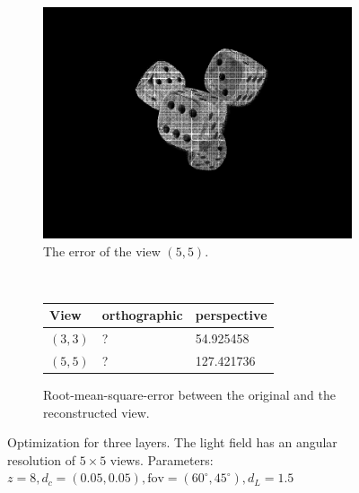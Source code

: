 \documentclass[11pt,a4paper,titlepage]{article}
\begin{document}
\begin{figure}[h]
\begin{subfigure}[t]{0.4\textwidth}
		\includegraphics[width=\textwidth]{results/dice_perspective_rec_3Layers_r=0/custom_view_error.png}
		\caption{The error of the view $\left( 5, 5 \right)$.}
	\end{subfigure}%
	\\
	\begin{subfigure}[t]{0.4\textwidth}
		\begin{tabular}{|l|l|l|}
			\hline 
			View & orthographic & perspective \\ 
			\hline 
			$\left(3, 3\right)$ & ? & 54.925458 \\ 
			\hline 
			$\left(5, 5\right)$ & ? & 127.421736 \\ 
			\hline 
		\end{tabular} 
		\caption{Root-mean-square-error between the original and the reconstructed view.}
	\end{subfigure}
	\caption{Optimization for three layers. The light field has an angular resolution of $5\times 5$ views. Parameters: $z = 8, d_c = \left( 0.05, 0.05 \right), \text{fov} = \left( 60^\circ, 45^\circ \right), d_L = 1.5$}
\end{figure}
\end{document}

